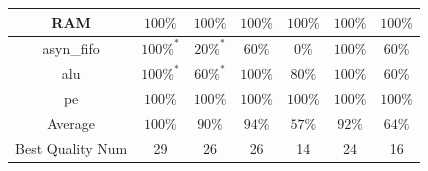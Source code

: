 \begin{tabular}{c|cc|cc|cc}
RAM & \color{black} {\cellcolor{lightblue}} $100\%$ & \color{black} {\cellcolor{lightgreen}} $100\%$ & \color{black} {\cellcolor{lightblue}} $100\%$ & \color{black} {\cellcolor{lightgreen}} $100\%$ & \color{black} {\cellcolor{lightblue}} $100\%$ & \color{black} {\cellcolor{lightgreen}} $100\%$ \\ \midrule
asyn\_fifo & \color{black} {\cellcolor{lightblue}} $100\%^*$ & $20\%^*$ & $60\%$ & $0\%$ & \color{black} {\cellcolor{lightblue}} $100\%$ & \color{black} {\cellcolor{lightgreen}} $60\%$ \\ \midrule
alu & \color{black} {\cellcolor{lightblue}} $100\%^*$ & $60\%^*$ & \color{black} {\cellcolor{lightblue}} $100\%$ & \color{black} {\cellcolor{lightgreen}} $80\%$ & \color{black} {\cellcolor{lightblue}} $100\%$ & $60\%$ \\ \midrule
pe & \color{black} {\cellcolor{lightblue}} $100\%$ & \color{black} {\cellcolor{lightgreen}} $100\%$ & \color{black} {\cellcolor{lightblue}} $100\%$ & \color{black} {\cellcolor{lightgreen}} $100\%$ & \color{black} {\cellcolor{lightblue}} $100\%$ & \color{black} {\cellcolor{lightgreen}} $100\%$ \\ \midrule
Average & \color{black} {\cellcolor{lightblue}} $100\%$ & \color{black} {\cellcolor{lightgreen}} $90\%$ & $94\%$ & $57\%$ & $92\%$ & $64\%$ \\ \midrule
Best Quality Num & \color{black} {\cellcolor{lightblue}} 29 & \color{black} {\cellcolor{lightgreen}} 26 & 26 & 14 & 24 & 16 \\
\bottomrule
\end{tabular}
